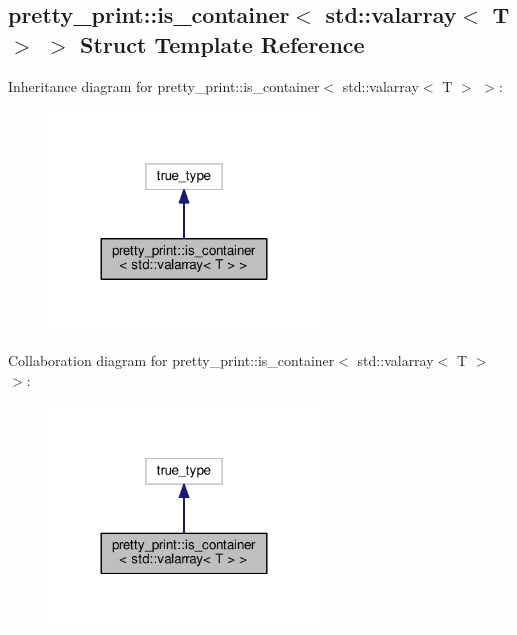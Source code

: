 \hypertarget{structpretty__print_1_1is__container_3_01std_1_1valarray_3_01T_01_4_01_4}{}\subsection{pretty\+\_\+print\+:\+:is\+\_\+container$<$ std\+:\+:valarray$<$ T $>$ $>$ Struct Template Reference}
\label{structpretty__print_1_1is__container_3_01std_1_1valarray_3_01T_01_4_01_4}


Inheritance diagram for pretty\+\_\+print\+:\+:is\+\_\+container$<$ std\+:\+:valarray$<$ T $>$ $>$\+:\nopagebreak
\begin{figure}[H]
\begin{center}
\leavevmode
\includegraphics[width=204pt]{structpretty__print_1_1is__container_3_01std_1_1valarray_3_01T_01_4_01_4__inherit__graph}
\end{center}
\end{figure}


Collaboration diagram for pretty\+\_\+print\+:\+:is\+\_\+container$<$ std\+:\+:valarray$<$ T $>$ $>$\+:\nopagebreak
\begin{figure}[H]
\begin{center}
\leavevmode
\includegraphics[width=204pt]{structpretty__print_1_1is__container_3_01std_1_1valarray_3_01T_01_4_01_4__coll__graph}
\end{center}
\end{figure}


